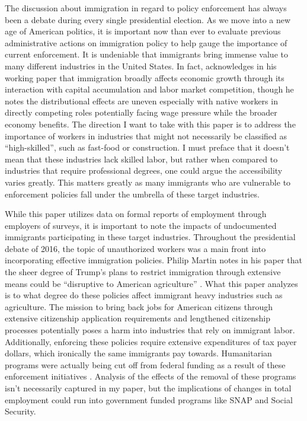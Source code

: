 \documentclass[12pt]{article}
\begin{document}
The discussion about immigration in regard to policy enforcement has always been a debate during every single presidential election. As we move into a new age of American politics, it is important now than ever to evaluate previous administrative actions on immigration policy to help gauge the importance of current enforcement. It is undeniable that immigrants bring immense value to many different industries in the United States. In fact, \citet{borjas2019} acknowledges in his working paper that immigration broadly affects economic growth through its interaction with capital accumulation and labor market competition, though he notes the distributional effects are uneven especially with native workers in directly competing roles potentially facing wage pressure while the broader economy benefits. The direction I want to take with this paper is to address the importance of workers in industries that might not necessarily be classified as ``high-skilled'', such as fast-food or construction. I must preface that it doesn't mean that these industries lack skilled labor, but rather when compared to industries that require professional degrees, one could argue the accessibility varies greatly. This matters greatly as many immigrants who are vulnerable to enforcement policies fall under the umbrella of these target industries.

While this paper utilizes data on formal reports of employment through employers of surveys, it is important to note the impacts of undocumented immigrants participating in these target industries. Throughout the presidential debate of 2016, the topic of unauthorized workers was a main front into incorporating effective immigration policies. Philip Martin notes in his paper that the sheer degree of Trump's plans to restrict immigration through extensive means could be ``disruptive to American agriculture'' \citep[p.~1]{martin2017}. What this paper analyzes is to what degree do these policies affect immigrant heavy industries such as agriculture. The mission to bring back jobs for American citizens through extensive citizenship application requirements and lengthened citizenship processes potentially poses a harm into industries that rely on immigrant labor. Additionally, enforcing these policies require extensive expenditures of tax payer dollars, which ironically the same immigrants pay towards. Humanitarian programs were actually being cut off from federal funding as a result of these enforcement initiatives \citep[p.~6]{pierce2018}. Analysis of the effects of the removal of these programs isn't necessarily captured in my paper, but the implications of changes in total employment could run into government funded programs like SNAP and Social Security.
\end{document}
